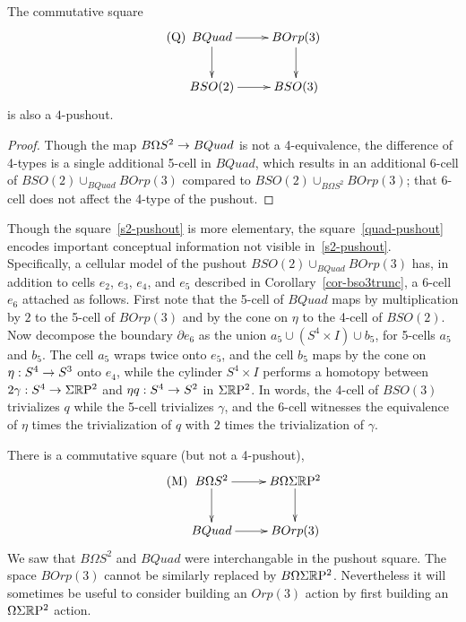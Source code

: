 \documentclass{amsart}
\begin{document}
\begin{corollary}
The commutative square
\begin{equation} \label{quad-pushout} \tag{Q}
\xymatrix{
BQuad \ar[r] \ar[d] & BOrp(3) \ar[d] \\
BSO(2) \ar[r] & BSO(3)
}
\end{equation}
is also a $4$-pushout.
\end{corollary}
\begin{proof}
Though the map $B\Omega S^2 \rightarrow BQuad$ is not a 4-equivalence, the difference of 4-types is a single additional 5-cell in $BQuad$, which results in an additional 6-cell of $BSO(2) \cup_{BQuad} BOrp(3)$ compared to $BSO(2) \cup_{B\Omega S^2} BOrp(3)$; that 6-cell does not affect the 4-type of the pushout.
\end{proof}

\nid Though the square~\eqref{s2-pushout} is more elementary, the square~\eqref{quad-pushout} encodes important conceptual information not visible in~\eqref{s2-pushout}.  Specifically, a cellular model of the pushout $BSO(2) \cup_{BQuad} BOrp(3)$ has, in addition to cells $e_2$, $e_3$, $e_4$, and $e_5$ described in Corollary~\ref{cor-bso3trunc}, a 6-cell $e_6$ attached as follows.  First note that the 5-cell of $BQuad$ maps by multiplication by $2$ to the 5-cell of $BOrp(3)$ and by the cone on $\eta$ to the 4-cell of $BSO(2)$.  %
Now decompose the boundary $\partial e_6$ as the union $a_5 \cup (S^4 \times I) \cup b_5$, for 5-cells $a_5$ and $b_5$.  The cell $a_5$ wraps twice onto $e_5$, and the cell $b_5$ maps by the cone on $\eta: S^4 \rightarrow S^3$ onto $e_4$, while the cylinder $S^4 \times I$ performs a homotopy between $2 \gamma : S^4 \rightarrow \Sigma \mathbb R \mathrm{P}^2$ and $\eta q: S^4 \rightarrow S^2$ in $\Sigma \mathbb R \mathrm{P}^2$.  In words, the 4-cell of $BSO(3)$ trivializes $q$ while the 5-cell trivializes $\gamma$, and the 6-cell witnesses the equivalence of $\eta$ times the trivialization of $q$ with $2$ times the trivialization of $\gamma$.

\begin{remark}
There is a commutative square (but not a 4-pushout),
\begin{equation}\label{quadmoore} \tag{M}
\xymatrix{
B\Omega S^2 \ar[r] \ar[d] & B\Omega \Sigma \RP^2 \ar[d] \\
BQuad \ar[r] & BOrp(3)
}
\end{equation}
We saw that $B\Omega S^2$ and $BQuad$ were interchangable in the pushout square.  The space $BOrp(3)$ cannot be similarly replaced by $B\Omega \Sigma \mathbb R \mathrm{P}^2$.  Nevertheless it will sometimes be useful to consider building an $Orp(3)$ action by first building an $\Omega \Sigma \mathbb R \mathrm{P}^2$ action.
\end{remark}
\end{document}
